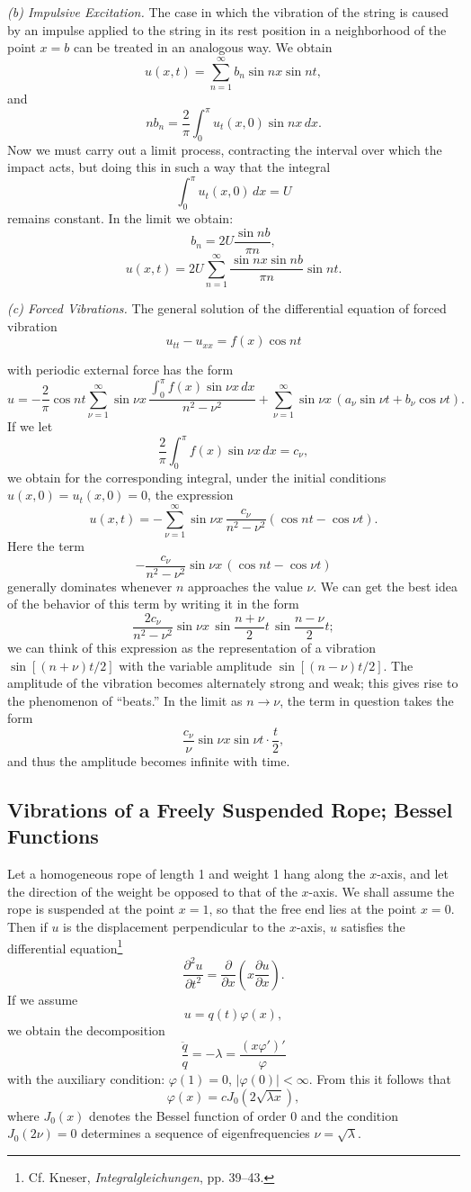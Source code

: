 \textit{(b) Impulsive Excitation.} The case in which the vibration of the string is caused by an impulse applied to the string in its rest position in a neighborhood of the point $x=b$ can be treated in an analogous way. We obtain
\[
u(x,t)=\sum_{n=1}^{\infty}b_n\sin nx\sin nt,
\]
and
\[
nb_n=\frac2\pi\int_0^{\pi}u_t(x,0)\sin nx\,dx.
\]
Now we must carry out a limit process, contracting the interval over which the impact acts, but doing this in such a way that the integral
\[
\int_0^{\pi}u_t(x,0)\,dx=U
\]
remains constant. In the limit we obtain:
\[
b_n=2U\frac{\sin nb}{\pi n},
\]
\[
u(x,t)=2U\sum_{n=1}^{\infty}\frac{\sin nx\sin nb}{\pi n}\sin nt.
\]

\textit{(c) Forced Vibrations.} The general solution of the differential equation of forced vibration
\[
u_{tt}-u_{xx}=f(x)\cos nt
\]

with periodic external force has the form
\[
u=-\frac{2}{\pi}\cos nt\sum_{\nu=1}^{\infty}\sin \nu x\,
\frac{\displaystyle\int_0^\pi f(x)\sin \nu x\,dx}{n^2-\nu^2}
+\sum_{\nu=1}^{\infty}\sin \nu x\,(a_\nu\sin \nu t+b_\nu\cos \nu t).
\]
If we let
\[
\frac{2}{\pi}\int_0^\pi f(x)\sin \nu x\,dx=c_\nu,
\]
we obtain for the corresponding integral, under the initial conditions
\(u(x,0)=u_t(x,0)=0\), the expression
\[
u(x,t)=-\sum_{\nu=1}^{\infty}\sin \nu x\,
\frac{c_\nu}{n^2-\nu^2}(\cos nt-\cos \nu t).
\]
Here the term
\[
-\frac{c_\nu}{n^2-\nu^2}\sin \nu x\,(\cos nt-\cos \nu t)
\]
generally dominates whenever $n$ approaches the value $\nu$. We can get the best idea of the behavior of this term by writing it in the form
\[
\frac{2c_\nu}{n^2-\nu^2}\sin \nu x\,
\sin\frac{n+\nu}{2}t\,\sin\frac{n-\nu}{2}t;
\]
we can think of this expression as the representation of a vibration
$\sin[(n+\nu)t/2]$ with the variable amplitude $\sin[(n-\nu)t/2]$.
The amplitude of the vibration becomes alternately strong and weak; this gives rise to the phenomenon of ``beats.'' In the limit as $n\to\nu$, the term in question takes the form
\[
\frac{c_\nu}{\nu}\sin \nu x\sin \nu t\cdot\frac t2,
\]
and thus the amplitude becomes infinite with time.

\subsection{Vibrations of a Freely Suspended Rope; Bessel Functions}
Let a homogeneous rope of length 1 and weight 1 hang along the $x$-axis, and let the direction of the weight be opposed to that of the $x$-axis. We shall assume the rope is suspended at the point $x=1$, so that the free end lies at the point $x=0$. Then if $u$ is the displacement perpendicular to the $x$-axis, $u$ satisfies the differential equation\footnote{Cf. Kneser, \emph{Integralgleichungen}, pp. 39--43.}
\[
\frac{\partial^2u}{\partial t^2}=\frac{\partial}{\partial x}
\left(x\frac{\partial u}{\partial x}\right).
\]
If we assume
\[
u=q(t)\varphi(x),
\]
we obtain the decomposition
\[
\frac{\ddot q}{q}=-\lambda=\frac{(x\varphi')'}{\varphi}
\]
with the auxiliary condition: $\varphi(1)=0$, $|\varphi(0)|<\infty$.
From this it follows that
\[
\varphi(x)=cJ_0(2\sqrt{\lambda x}),
\]
where $J_0(x)$ denotes the Bessel function of order 0 and the condition $J_0(2\nu)=0$ determines a sequence of eigenfrequencies $\nu=\sqrt\lambda$.

